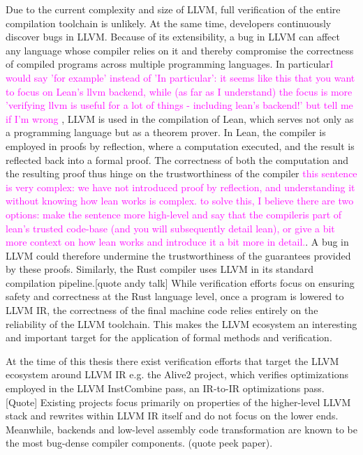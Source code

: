 Due to the current complexity and size of LLVM, full verification of the entire compilation toolchain is unlikely. At the same time, developers continuously discover bugs in LLVM. Because of its extensibility, a bug in LLVM can affect any language whose compiler relies on it and thereby compromise the correctness of compiled programs across multiple programming languages.
In particular\textcolor{magenta}{I would say 'for example' instead of 'In particular': it seems like this that you want to focus on Lean's llvm backend, while (as far as I understand) the focus is more 'verifying llvm is useful for a lot of things - including lean's backend!' but tell me if I'm wrong} , LLVM is used in the compilation of Lean, which serves not only as a programming language but  as a theorem prover. In Lean, the compiler is employed in proofs by reflection, where a computation  executed, and the result is reflected back into a formal proof. The correctness of both the computation and the resulting proof thus hinge on the trustworthiness of the compiler \textcolor{magenta}{this sentence is very complex: we have not introduced proof by reflection, and understanding it without knowing how lean works is complex. to solve this, I believe there are two options: make the sentence more high-level and say that the compileris part of lean's trusted code-base (and you will subsequently detail lean), or give a bit more context on how lean works and introduce it a bit more in detail.}. A bug in LLVM could therefore undermine the trustworthiness of the guarantees provided by these proofs. Similarly, the Rust compiler uses LLVM in its standard compilation pipeline.[quote andy talk] While verification efforts focus on ensuring safety and correctness at the Rust language level, once a program is lowered to LLVM IR, the correctness of the final machine code relies entirely on the reliability of the LLVM toolchain. This makes the LLVM ecosystem an interesting and important target for the application of formal methods and verification.


At the time of this thesis there exist verification efforts that target the LLVM ecosystem around LLVM IR e.g. the Alive2 project, which verifies optimizations employed in the LLVM InstCombine pass, an IR-to-IR optimizations pass. [Quote]
Existing projects focus primarily on properties of the higher-level LLVM stack and rewrites within LLVM IR itself and do not focus on the lower ends. Meanwhile, backends and low-level assembly code transformation are known to be the most bug-dense compiler components. (quote peek paper). 

